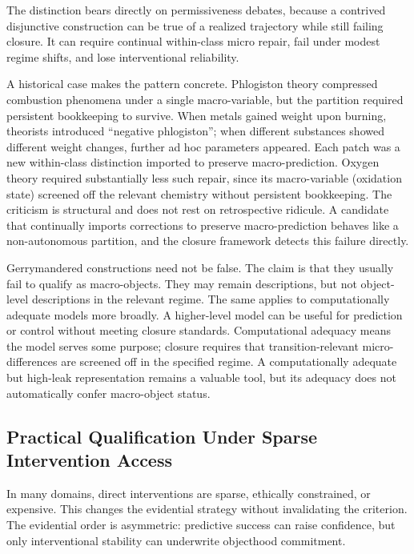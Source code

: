 The distinction bears directly on permissiveness debates, because a
contrived disjunctive construction can be true of a realized trajectory
while still failing closure. It can require continual within-class
micro repair, fail under modest regime shifts, and lose interventional
reliability.

A historical case makes the pattern concrete. Phlogiston theory
compressed combustion phenomena under a single macro-variable, but the
partition required persistent bookkeeping to survive. When metals gained
weight upon burning, theorists introduced ``negative phlogiston''; when
different substances showed different weight changes, further ad hoc
parameters appeared. Each patch was a new within-class distinction
imported to preserve macro-prediction. Oxygen theory required
substantially less such repair, since its macro-variable (oxidation state)
screened off the relevant chemistry without persistent bookkeeping. The
criticism is structural and does not rest on retrospective ridicule. A
candidate that continually imports corrections to preserve
macro-prediction behaves like a non-autonomous partition, and the
closure framework detects this failure directly.

Gerrymandered constructions need not be false. The claim is that they
usually fail to qualify as macro-objects. They may remain descriptions,
but not object-level descriptions in the relevant regime. The same
applies to computationally adequate models more broadly. A higher-level
model can be useful for prediction or control without meeting closure
standards. Computational adequacy means the model serves some purpose;
closure requires that transition-relevant micro-differences are screened
off in the specified regime. A computationally adequate but high-leak
representation remains a valuable tool, but its adequacy does not
automatically confer macro-object status.

\subsection{Practical Qualification Under Sparse Intervention
	Access}\label{practical-qualification-under-sparse-intervention-access}

In many domains, direct interventions are sparse, ethically constrained,
or expensive. This changes the evidential strategy without invalidating
the criterion. The evidential order is asymmetric: predictive success
can raise confidence, but only interventional stability can underwrite
objecthood commitment.


